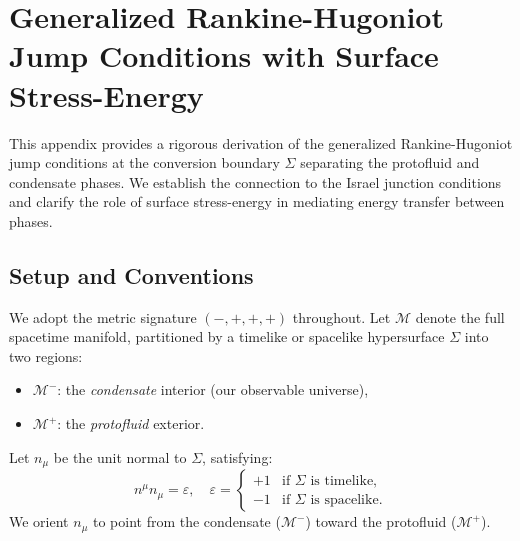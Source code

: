 %
%
%


\section{Generalized Rankine-Hugoniot Jump Conditions with Surface Stress-Energy}
\label{app:RH_derivation}

This appendix provides a rigorous derivation of the generalized Rankine-Hugoniot jump conditions at the conversion boundary $\Sigma$ separating the protofluid and condensate phases. We establish the connection to the Israel junction conditions and clarify the role of surface stress-energy in mediating energy transfer between phases.

\subsection{Setup and Conventions}
\label{app:RH_setup}

We adopt the metric signature $(-,+,+,+)$ throughout. Let $\mathcal{M}$ denote the full spacetime manifold, partitioned by a timelike or spacelike hypersurface $\Sigma$ into two regions:
\begin{itemize}
    \item $\mathcal{M}^{-}$: the \emph{condensate} interior (our observable universe),
    \item $\mathcal{M}^{+}$: the \emph{protofluid} exterior.
\end{itemize}

\begin{definition}
Let $n_\mu$ be the unit normal to $\Sigma$, satisfying:
\begin{equation}
\label{eq:normal_def}
n^\mu n_\mu = \varepsilon, \quad \varepsilon =
\begin{cases}
+1 & \text{if } \Sigma \text{ is timelike}, \\
-1 & \text{if } \Sigma \text{ is spacelike}.
\end{cases}
\end{equation}
We orient $n_\mu$ to point from the condensate ($\mathcal{M}^{-}$) toward the protofluid ($\mathcal{M}^{+}$).
\end{definition}

